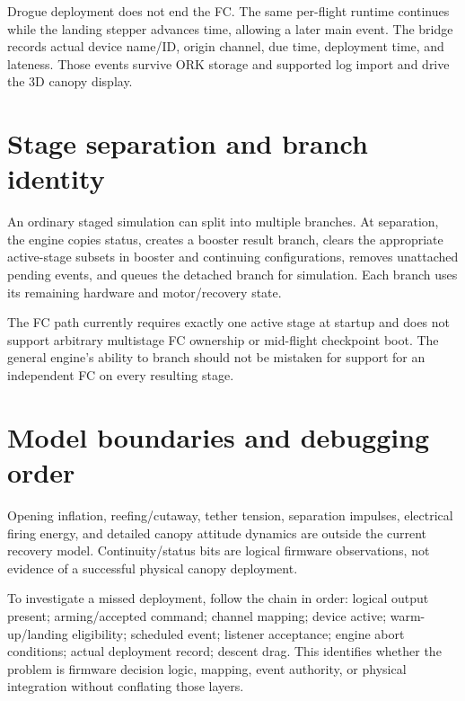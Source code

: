 Drogue deployment does not end the FC. The same per-flight runtime continues while the landing stepper advances time, allowing a later main event. The bridge records actual device name/ID, origin channel, due time, deployment time, and lateness. Those events survive ORK storage and supported log import and drive the 3D canopy display.

\section{Stage separation and branch identity}
An ordinary staged simulation can split into multiple branches. At separation, the engine copies status, creates a booster result branch, clears the appropriate active-stage subsets in booster and continuing configurations, removes unattached pending events, and queues the detached branch for simulation. Each branch uses its remaining hardware and motor/recovery state.

The FC path currently requires exactly one active stage at startup and does not support arbitrary multistage FC ownership or mid-flight checkpoint boot. The general engine's ability to branch should not be mistaken for support for an independent FC on every resulting stage.

\section{Model boundaries and debugging order}
Opening inflation, reefing/cutaway, tether tension, separation impulses, electrical firing energy, and detailed canopy attitude dynamics are outside the current recovery model. Continuity/status bits are logical firmware observations, not evidence of a successful physical canopy deployment.

To investigate a missed deployment, follow the chain in order: logical output present; arming/accepted command; channel mapping; device active; warm-up/landing eligibility; scheduled event; listener acceptance; engine abort conditions; actual deployment record; descent drag. This identifies whether the problem is firmware decision logic, mapping, event authority, or physical integration without conflating those layers.

